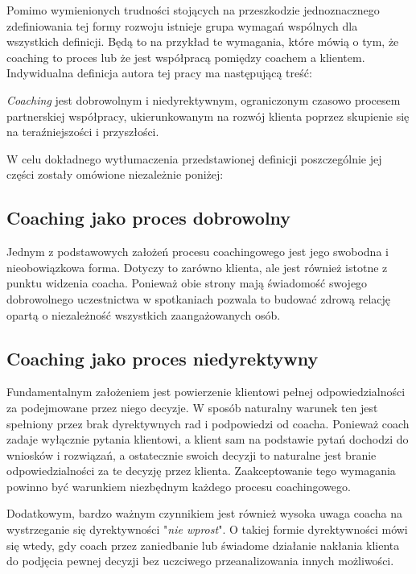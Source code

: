 Pomimo wymienionych trudności stojących na przeszkodzie jednoznacznego zdefiniowania tej formy rozwoju istnieje grupa wymagań wspólnych dla
wszystkich definicji. Będą to na przykład te wymagania, które mówią o tym, że coaching to proces lub że jest współpracą pomiędzy
coachem a klientem. Indywidualna definicja autora tej pracy ma następującą treść:
\begin{defn}
  \emph{Coaching} jest dobrowolnym i niedyrektywnym, ograniczonym czasowo procesem partnerskiej współpracy,
  ukierunkowanym na rozwój klienta poprzez skupienie się na teraźniejszości i przyszłości.
  \label{definicja}
\end{defn}

W celu dokładnego wytłumaczenia przedstawionej definicji poszczególnie jej części zostały omówione niezależnie poniżej:

\subsection{Coaching jako proces dobrowolny}
Jednym z podstawowych założeń procesu coachingowego jest jego swobodna i nieobowiązkowa forma. Dotyczy to zarówno klienta, ale jest
również istotne z punktu widzenia coacha. Ponieważ obie strony mają świadomość swojego dobrowolnego uczestnictwa w spotkaniach pozwala to budować
zdrową relację opartą o niezależność wszystkich zaangażowanych osób.

\subsection{Coaching jako proces niedyrektywny}
Fundamentalnym założeniem jest powierzenie klientowi pełnej odpowiedzialności za podejmowane przez niego decyzje. W sposób naturalny
warunek ten jest spełniony przez brak dyrektywnych rad i podpowiedzi od coacha. Ponieważ coach zadaje wyłącznie pytania klientowi,
a klient sam na podstawie pytań dochodzi do wniosków i rozwiązań, a ostatecznie swoich decyzji to naturalne jest branie odpowiedzialności
za te decyzję przez klienta. Zaakceptowanie tego wymagania powinno być warunkiem niezbędnym każdego procesu coachingowego.

Dodatkowym, bardzo ważnym czynnikiem jest również wysoka uwaga coacha na wystrzeganie się dyrektywności "\emph{nie wprost}". O takiej formie
dyrektywności mówi się wtedy, gdy coach przez zaniedbanie lub świadome działanie nakłania klienta do podjęcia pewnej decyzji bez uczciwego przeanalizowania
innych możliwości. \\

